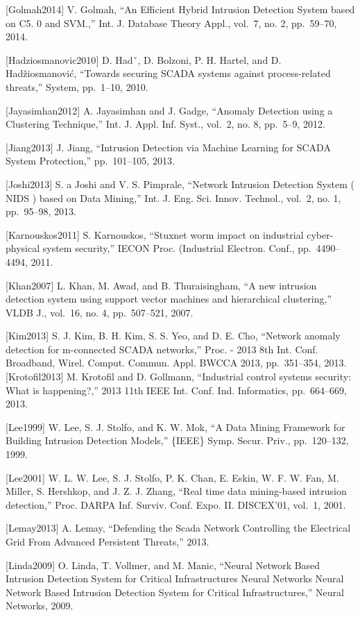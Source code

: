 \documentclass[12pt,]{article}
\begin{document}
{[}Golmah2014{]} V. Golmah, ``An Efficient Hybrid Intrusion Detection
System based on C5. 0 and SVM.,'' Int. J. Database Theory Appl., vol.~7,
no. 2, pp.~59--70, 2014.

{[}Hadziosmanovic2010{]} D. Hadˇ, D. Bolzoni, P. H. Hartel, and D.
Hadžiosmanović, ``Towards securing SCADA systems against process-related
threats,'' System, pp.~1--10, 2010.

{[}Jayasimhan2012{]} A. Jayasimhan and J. Gadge, ``Anomaly Detection
using a Clustering Technique,'' Int. J. Appl. Inf. Syst., vol.~2, no. 8,
pp.~5--9, 2012.

{[}Jiang2013{]} J. Jiang, ``Intrusion Detection via Machine Learning for
SCADA System Protection,'' pp.~101--105, 2013.

{[}Joshi2013{]} S. a Joshi and V. S. Pimprale, ``Network Intrusion
Detection System ( NIDS ) based on Data Mining,'' Int. J. Eng. Sci.
Innov. Technol., vol.~2, no. 1, pp.~95--98, 2013.

{[}Karnouskos2011{]} S. Karnouskos, ``Stuxnet worm impact on industrial
cyber-physical system security,'' IECON Proc. (Industrial Electron.
Conf., pp.~4490--4494, 2011.

{[}Khan2007{]} L. Khan, M. Awad, and B. Thuraisingham, ``A new intrusion
detection system using support vector machines and hierarchical
clustering,'' VLDB J., vol.~16, no. 4, pp.~507--521, 2007.

{[}Kim2013{]} S. J. Kim, B. H. Kim, S. S. Yeo, and D. E. Cho, ``Network
anomaly detection for m-connected SCADA networks,'' Proc. - 2013 8th
Int. Conf. Broadband, Wirel. Comput. Commun. Appl. BWCCA 2013,
pp.~351--354, 2013. {[}Krotofil2013{]} M. Krotofil and D. Gollmann,
``Industrial control systems security: What is happening?,'' 2013 11th
IEEE Int. Conf. Ind. Informatics, pp.~664--669, 2013.

{[}Lee1999{]} W. Lee, S. J. Stolfo, and K. W. Mok, ``A Data Mining
Framework for Building Intrusion Detection Models,'' \{IEEE\} Symp.
Secur. Priv., pp.~120--132, 1999.

{[}Lee2001{]} W. L. W. Lee, S. J. Stolfo, P. K. Chan, E. Eskin, W. F. W.
Fan, M. Miller, S. Hershkop, and J. Z. J. Zhang, ``Real time data
mining-based intrusion detection,'' Proc. DARPA Inf. Surviv. Conf. Expo.
II. DISCEX'01, vol.~1, 2001.

{[}Lemay2013{]} A. Lemay, ``Defending the Scada Network Controlling the
Electrical Grid From Advanced Persistent Threats,'' 2013.

{[}Linda2009{]} O. Linda, T. Vollmer, and M. Manic, ``Neural Network
Based Intrusion Detection System for Critical Infrastructures Neural
Networks Neural Network Based Intrusion Detection System for Critical
Infrastructures,'' Neural Networks, 2009.
\end{document}
